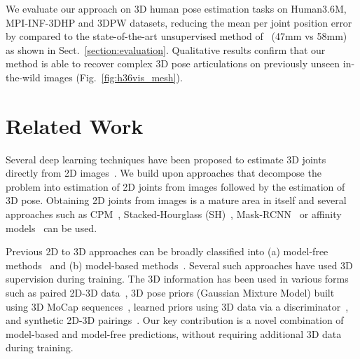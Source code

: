 \documentclass[10pt,twocolumn,letterpaper]{article}
\begin{document}
We evaluate our approach on 3D human pose estimation tasks on Human3.6M, MPI-INF-3DHP and 3DPW datasets, reducing the mean per joint position error by  compared to the state-of-the-art unsupervised method of~\cite{chingCVPR2019} (47mm vs 58mm) as shown in Sect.~\ref{section:evaluation}. Qualitative results confirm that our method is able to recover complex 3D pose articulations on previously unseen in-the-wild images (\eg Fig.~\ref{fig:h36vis_mesh}). 





















 


\section{Related Work}
\label{section:related_work}

Several deep learning techniques have been proposed to estimate 3D joints directly from 2D images~\cite{ChenWeaklyGeometryAwareCVPR19,ChengOcclusionAwareICCV19,HabibieInTheWildCVPR2019,IskakovLearnableTriangulationICCV2019,liang2019shapeaware,MoonICCV19,park20163d,conf/bmvc/ParkK18,Pavlakos_2017_CVPR,Rogez_2017_CVPR,SharmaMonocularICCV2019, tome2017lifting, WangNotAllPartsICCV2019, wang2019generalizing,sun2017compositional, ZhaoSemanticCVPR19,HEMletsICCV19}. 
We build upon approaches that decompose the problem into estimation of 2D joints from images followed by the estimation of 3D pose. Obtaining 2D joints from images is a mature area in itself and several approaches such as CPM~\cite{cpm}, Stacked-Hourglass (SH)~\cite{stacked-hourglass}, Mask-RCNN~\cite{mask-rcnn} or affinity models~\cite{OpenPose} can be used. 

Previous 2D to 3D approaches can be broadly classified into (a) model-free methods~\cite{CaiGCNICCV2019,ChenDeva2017,tung_2017_ICCV,IGENet,MartinezICCV2017,Moreno-Noguer_2017_CVPR,mehta2017monocular} and (b) model-based methods~\cite{kolotouros2019convolutional, kanazawa2018end, kanazawa2019learning, xu2019denserac}. Several such approaches have used 3D supervision during training. The 3D information has been used in various forms such as paired 2D-3D data~\cite{ChenDeva2017,IGENet,LiMDNCVPR19,MartinezICCV2017,mehta2017vnect,Moreno-Noguer_2017_CVPR,pavllo20193d}, 3D pose priors (\eg Gaussian Mixture Model) built using 3D MoCap sequences~\cite{bogo2016keep,SPIN_ICCV2019}, learned priors using 3D data via a discriminator~\cite{kanazawa2018end}, and synthetic 2D-3D pairings~\cite{pavlakos2018humanshape,xu2019denserac}. Our key contribution is a novel combination of model-based and model-free predictions, without requiring additional 3D data during training. 
\end{document}
